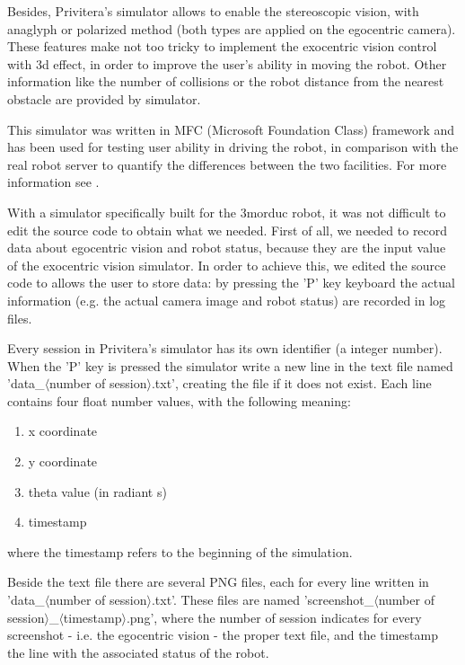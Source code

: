 %
Besides, Privitera's simulator allows to enable the 
stereoscopic vision, with anaglyph or polarized method (both 
types are applied on the egocentric camera). These features 
make not too tricky to implement the exocentric vision control 
with 3d effect, in order to improve the user's ability in 
moving the robot. Other information like the number of collisions 
or the robot distance from the nearest obstacle are provided 
by simulator.
%

%
This simulator was written in MFC (Microsoft Foundation Class) 
framework and has been used for testing user ability in
driving the robot, in comparison with the real robot server 
to quantify the differences between the two facilities. 
For more information see \cite{privitera}.
%

%
With a simulator specifically built for the 3morduc robot, it 
was not difficult to edit the source code to obtain what we 
needed. First of all, we needed to record data about egocentric 
vision and robot status, because they are the input value 
of the exocentric vision simulator. In order to achieve this, 
we edited the source code to allows the user to store data: by 
pressing the 'P' key keyboard the actual information (e.g. the 
actual camera image and robot status) are recorded in log files.
%

%
Every session in Privitera's simulator has its own identifier 
(a integer number). When the 'P' key is pressed the simulator 
write a new line in the text file named 'data\_$\langle$number 
of session$\rangle$.txt', creating the file if it does not 
exist. Each line contains four float number values, with the 
following meaning:
%
\begin{enumerate}
\item x coordinate
\item y coordinate
\item theta value (in radiant s)
\item timestamp
\end{enumerate}
%
where the timestamp refers to the beginning of the simulation.
%

%
Beside the text file there are several PNG files, each for every 
line written in 'data\_$\langle$number of session$\rangle$.txt'. 
These files are named 'screenshot\_$\langle$number of 
session$\rangle$\_$\langle$timestamp$\rangle$.png', where the 
number of session indicates for every screenshot 
- i.e. the egocentric vision - the proper text file, and the 
timestamp the line with the associated status of the robot.
%

